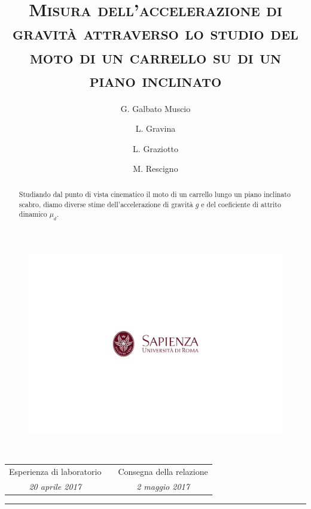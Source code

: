 \documentclass[10pt,oneside,a4paper]{article}
\title{\textsc{Misura dell'accelerazione di gravità attraverso lo studio del moto di un carrello su di un piano inclinato }}
\author{\small{G. Galbato Muscio} \and \small{L. Gravina} \and \small{L. Graziotto} \and \small{M. Rescigno}}
\date{}
\begin{document}
	\begin{figure}%
		\centering
		\includegraphics[scale=0.5,trim={2.8cm 8.9cm 0 9cm},clip]{logo.png}
	\end{figure}
	\maketitle
	\begin{center} 
		 \\
		\vspace{1cm}
		\begin{tabular}{ccc}
			Esperienza di laboratorio && Consegna della relazione \\
			\emph{\small{20 aprile 2017}} && \emph{\small{2 maggio 2017}} \\
		\end{tabular} 
		
		\vspace{0.5cm}
		
	\end{center}
\hrule
\vspace{0.5cm}
\begin{abstract}
	Studiando dal punto di vista cinematico il moto di un carrello lungo un piano inclinato scabro, diamo diverse stime dell'accelerazione di gravità $g$ e del coeficiente di attrito dinamico $\mu_d$.
\end{abstract}
\newpage
\tableofcontents %
\listoftables %
\listoffigures %
\pagebreak
\end{document}
